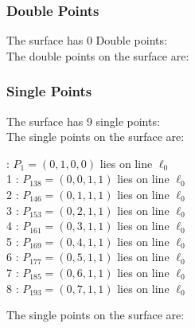 \documentclass{article}
\begin{document}
{\subsubsection*{Double Points}
The surface has 0 Double points:\\
The double points on the surface are:\\
\begin{multicols}{2}
\noindent
\end{multicols}
\subsubsection*{Single Points}
The surface has 9 single points:\\
The single points on the surface are:\\
\begin{multicols}{2}
 : $P_{1}=( 0, 1, 0, 0 )$ lies on line $\ell_{0}$\\
1 : $P_{138}=( 0, 0, 1, 1 )$ lies on line $\ell_{0}$\\
2 : $P_{146}=( 0, 1, 1, 1 )$ lies on line $\ell_{0}$\\
3 : $P_{153}=( 0, 2, 1, 1 )$ lies on line $\ell_{0}$\\
4 : $P_{161}=( 0, 3, 1, 1 )$ lies on line $\ell_{0}$\\
5 : $P_{169}=( 0, 4, 1, 1 )$ lies on line $\ell_{0}$\\
6 : $P_{177}=( 0, 5, 1, 1 )$ lies on line $\ell_{0}$\\
7 : $P_{185}=( 0, 6, 1, 1 )$ lies on line $\ell_{0}$\\
8 : $P_{193}=( 0, 7, 1, 1 )$ lies on line $\ell_{0}$\\
\end{multicols}
The single points on the surface are:\\
}
\end{document}
